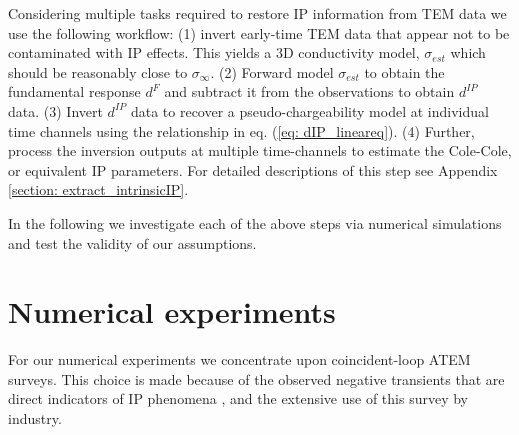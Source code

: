 \documentclass[extra,mreferee]{gji}
\newcommand{\siginf}{\sigma_\infty}
\newcommand{\dip}{d^{IP}}
\begin{document}
Considering multiple tasks required to restore IP information from TEM data we use the following workflow:  (1) invert early-time TEM data that appear not to be contaminated with IP effects. This yields a 3D conductivity model, $\sigma_{est}$ which should be reasonably close to $\siginf$. 
(2) Forward model $\sigma_{est}$ to obtain the fundamental response $d^F$ and subtract it from the observations to obtain $\dip$ data. 
(3) Invert  $\dip$ data to recover a pseudo-chargeability model at individual time channels using the relationship in eq. (\ref{eq: dIP_lineareq}). 
(4) Further, process the inversion outputs at multiple time-channels  to estimate the Cole-Cole, or equivalent IP parameters. For detailed descriptions of this step see Appendix \ref{section: extract_intrinsicIP}. 

In the following we investigate each of the above steps via numerical simulations and test the validity of our assumptions. 


\section{Numerical experiments}
\label{section: numerical_examples}
For our numerical experiments we concentrate upon coincident-loop ATEM surveys. This choice is made because of the observed negative transients that are direct indicators of IP phenomena \cite[]{SmithandKlein,Kratzer2012,Kang2015a}, and the extensive use of this survey by industry.  
\end{document}
